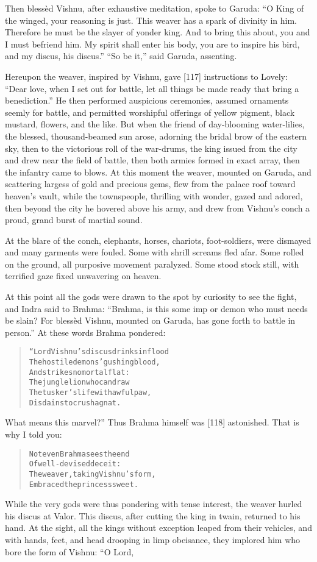 \documentclass[article, twoside, 14pt]{memoir}
\renewenvironment{verbatim}{%
\begin{quote}%
\vskip -10pt%
\begin{alltt}\normalfont\large}{\end{alltt}%
\end{quote}%
\vskip -10pt
} %
\begin{document}
Then blessèd Vishnu, after exhaustive meditation, spoke to Garuda:
``O King of the winged, your reasoning is just. This weaver has a spark of divinity in him. Therefore he must be the slayer of yonder king. And to bring this about, you and I must befriend him. My spirit shall enter his body, you are to inspire his bird, and my discus, his discus.''
``So be it,'' said Garuda, assenting.

Hereupon the weaver, inspired by Vishnu, gave [117] instructions to
Lovely:
``Dear love, when I set out for battle, let all things be made ready that bring a benediction.''
He then performed auspicious ceremonies, assumed ornaments seemly
for battle, and permitted worshipful offerings of yellow pigment,
black mustard, flowers, and the like. But when the friend of
day-blooming water-lilies, the blessed, thousand-beamed sun arose,
adorning the bridal brow of the eastern sky, then to the victorious
roll of the war-drums, the king issued from the city and drew near
the field of battle, then both armies formed in exact array, then
the infantry came to blows. At this moment the weaver, mounted on
Garuda, and scattering largess of gold and precious gems, flew from
the palace roof toward heaven's vault, while the townspeople,
thrilling with wonder, gazed and adored, then beyond the city he
hovered above his army, and drew from Vishnu's conch a proud, grand
burst of martial sound.

At the blare of the conch, elephants, horses, chariots,
foot-soldiers, were dismayed and many garments were fouled. Some
with shrill screams fled afar. Some rolled on the ground, all
purposive movement paralyzed. Some stood stock still, with
terrified gaze fixed unwavering on heaven.

At this point all the gods were drawn to the spot by curiosity to
see the fight, and Indra said to Brahma:
``Brahma, is this some imp or demon who must needs be slain? For blessèd Vishnu, mounted on Garuda, has gone forth to battle in person.''
At these words Brahma pondered:

\begin{verbatim}
“Lord Vishnu's discus drinks in flood
The hostile demons' gushing blood,
    And strikes no mortal flat:
The jungle lion who can draw
The tusker's life with awful paw,
    Disdains to crush a gnat.
\end{verbatim}
What means this marvel?” Thus Brahma himself was [118] astonished.
That is why I told you:

\begin{verbatim}
Not even Brahma sees the end
    Of well-devised deceit:
The weaver, taking Vishnu's form,
    Embraced the princess sweet.
\end{verbatim}
While the very gods were thus pondering with tense interest, the
weaver hurled his discus at Valor. This discus, after cutting the
king in twain, returned to his hand. At the sight, all the kings
without exception leaped from their vehicles, and with hands, feet,
and head drooping in limp obeisance, they implored him who bore the
form of Vishnu: “O Lord,
\end{document}
